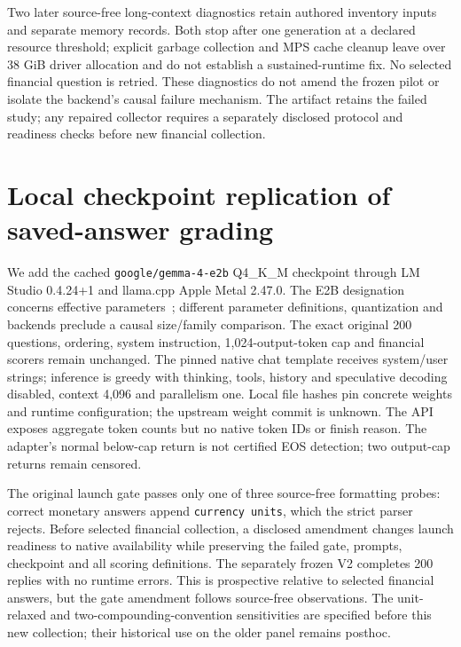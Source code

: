 Two later source-free long-context diagnostics retain authored inventory inputs and separate memory records. Both stop after one generation at a declared resource threshold; explicit garbage collection and MPS cache cleanup leave over 38 GiB driver allocation and do not establish a sustained-runtime fix. No selected financial question is retried. These diagnostics do not amend the frozen pilot or isolate the backend's causal failure mechanism. The artifact retains the failed study; any repaired collector requires a separately disclosed protocol and readiness checks before new financial collection.

\section{Local checkpoint replication of saved-answer grading}\label{app:gemma-replication}
We add the cached \texttt{google/gemma-4-e2b} Q4\_K\_M checkpoint through LM Studio 0.4.24+1 and llama.cpp Apple Metal 2.47.0. The E2B designation concerns effective parameters~\cite{gemma4card}; different parameter definitions, quantization and backends preclude a causal size/family comparison. The exact original 200 questions, ordering, system instruction, 1,024-output-token cap and financial scorers remain unchanged. The pinned native chat template receives system/user strings; inference is greedy with thinking, tools, history and speculative decoding disabled, context 4,096 and parallelism one. Local file hashes pin concrete weights and runtime configuration; the upstream weight commit is unknown. The API exposes aggregate token counts but no native token IDs or finish reason. The adapter's normal below-cap return is not certified EOS detection; two output-cap returns remain censored.

The original launch gate passes only one of three source-free formatting probes: correct monetary answers append \texttt{currency units}, which the strict parser rejects. Before selected financial collection, a disclosed amendment changes launch readiness to native availability while preserving the failed gate, prompts, checkpoint and all scoring definitions. The separately frozen V2 completes 200 replies with no runtime errors. This is prospective relative to selected financial answers, but the gate amendment follows source-free observations. The unit-relaxed and two-compounding-convention sensitivities are specified before this new collection; their historical use on the older panel remains posthoc.

